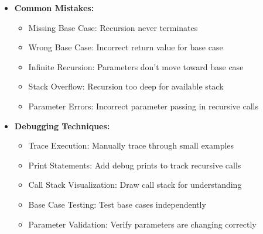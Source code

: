 \documentclass[a4paper,10pt]{book}
\begin{document}
\begin{itemize}[leftmargin=*]
    \item \textbf{Common Mistakes:}
    \begin{itemize}
        \item Missing Base Case: Recursion never terminates
        \item Wrong Base Case: Incorrect return value for base case
        \item Infinite Recursion: Parameters don't move toward base case
        \item Stack Overflow: Recursion too deep for available stack
        \item Parameter Errors: Incorrect parameter passing in recursive calls
    \end{itemize}

    \item \textbf{Debugging Techniques:}
    \begin{itemize}
        \item Trace Execution: Manually trace through small examples
        \item Print Statements: Add debug prints to track recursive calls
        \item Call Stack Visualization: Draw call stack for understanding
        \item Base Case Testing: Test base cases independently
        \item Parameter Validation: Verify parameters are changing correctly
    \end{itemize}
\end{itemize}
\end{document}
